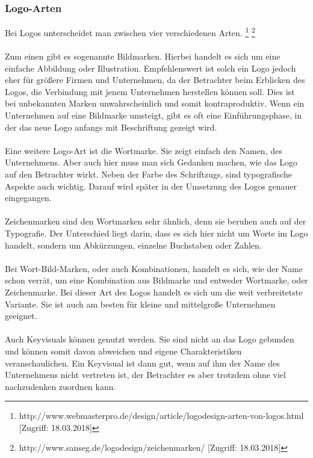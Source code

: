 \subsubsection{Logo-Arten}
Bei Logos unterscheidet man zwischen vier verschiedenen Arten. \footnote{\label{foot:3} http://www.webmasterpro.de/design/article/logodesign-arten-von-logos.html [Zugriff: 18.03.2018]} \footnote{\label{foot:4} http://www.sanseg.de/logodesign/zeichenmarken/ [Zugriff: 18.03.2018]}
\\
\\
Zum einen gibt es sogenannte Bildmarken. Hierbei handelt es sich um eine einfache Abbildung oder Illustration. Empfehlenswert ist solch ein Logo jedoch eher für größere Firmen und Unternehmen, da der Betrachter beim Erblicken des Logos, die Verbindung mit jenem Unternehmen herstellen können soll. Dies ist bei unbekannten Marken unwahrscheinlich und somit kontraproduktiv. Wenn ein Unternehmen auf eine Bildmarke umsteigt, gibt es oft eine Einführungsphase, in der das neue Logo anfangs mit Beschriftung gezeigt wird.
\\
\\
Eine weitere Logo-Art ist die Wortmarke. Sie zeigt einfach den Namen, des Unternehmens. Aber auch hier muss man sich Gedanken machen, wie das Logo auf den Betrachter wirkt. Neben der Farbe des Schriftzugs, sind typografische Aspekte auch wichtig. Darauf wird später in der Umsetzung des Logos genauer eingegangen.
\\
\\
Zeichenmarken sind den Wortmarken sehr ähnlich, denn sie beruhen auch auf der Typografie. Der Unterschied liegt darin, dass es sich hier nicht um Worte im Logo handelt, sondern um Abkürzungen, einzelne Buchstaben oder Zahlen.
\\
\\
Bei Wort-Bild-Marken, oder auch Kombinationen, handelt es sich, wie der Name schon verrät, um eine Kombination aus Bildmarke und entweder Wortmarke, oder Zeichenmarke. Bei dieser Art des Logos handelt es sich um die weit verbreitetste Variante. Sie ist auch am besten für kleine und mittelgroße Unternehmen geeignet.
\\
\\
Auch Keyvisuals können genutzt werden. Sie sind nicht an das Logo gebunden und können somit davon abweichen und eigene Charakteristiken veranschaulichen. Ein Keyvisual ist dann gut, wenn auf ihm der Name des Unternehmens nicht vertreten ist, der Betrachter es aber trotzdem ohne viel nachzudenken zuordnen kann.

